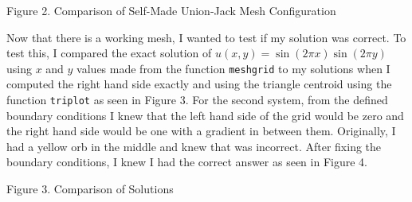 \documentclass[11pt, oneside]{article}   	%
\begin{document}
\vspace{2mm}

\centerline {}
\centerline{Figure 2. Comparison of Self-Made Union-Jack Mesh Configuration}

\vspace{5mm}

Now that there is a working mesh, I wanted to test if my solution was correct. To test this, I compared the exact solution of $u(x,y) = \sin(2\pi x)\sin(2\pi y)$ using $x$ and $y$ values made from the function \texttt{meshgrid} to my solutions when I computed the right hand side exactly and using the triangle centroid using the function \texttt{triplot} as seen in Figure 3. For the second system, from the defined boundary conditions I knew that the left hand side of the grid would be zero and the right hand side would be one with a gradient in between them. Originally, I had a yellow orb in the middle and knew that was incorrect. After fixing the boundary conditions, I knew I had the correct answer as seen in Figure 4.

\vspace{2mm}

\centerline {}
\centerline{Figure 3. Comparison of Solutions}
\end{document}
